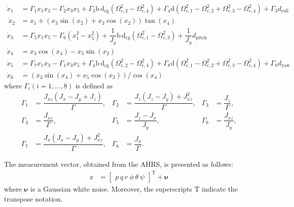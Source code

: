 \documentclass[3p]{elsarticle}
\begin{document}
\begin{align}
    \dot x_1& = \Gamma_1x_1x_3 - \Gamma_2x_3x_5 + \Gamma_3 \mathrm{b\,d}_{\text{cg}} (\Omega_{c, 2}^2 - \Omega_{c, 4}^2) + \Gamma_4\mathrm{d} (\Omega_{c, 1}^2 - \Omega_{c, 2}^2 + \Omega_{c, 3}^2 - \Omega_{c, 4}^2)+\Gamma_3d_{\text{roll}}\\[2mm]~\label{eq:eq_of_motion_start1}
    \dot x_2 &= x_1 + (x_3\sin(x_2) + x_3\cos(x_2))\tan(x_4)\\
    \dot x_3 &= \Gamma_5x_1x_5 - \Gamma_6(x_1^2-x_5^2) + \dfrac{1}{J_y}\mathrm{b\,d}_{\text{cg}} (\Omega_{c, 1}^2 - \Omega_{c, 3}^2)+ \dfrac{1}{J_y}d_{\text{pitch}}\\
    \dot x_4 &= x_3\cos(x_4) - x_5\sin(x_2)\\[2mm]
    \dot x_5 &= \Gamma_7x_1x_3 - \Gamma_1x_3x_5 + \Gamma_4\mathrm{b\,d}_{\text{cg}} (\Omega_{c, 2}^2 - \Omega_{c, 4}^2)+\Gamma_8\mathrm{d} (\Omega_{c, 1}^2 - \Omega_{c, 2}^2 + \Omega_{c, 3}^2 - \Omega_{c, 4}^2)+\Gamma_8d_{\text{yaw}}\\[2mm]
    \dot x_6 &= (x_3\sin(x_4) + x_5\cos(x_2))/\cos(x_4)~\label{eq:eq_of_motion_end1}
\end{align}
where $\Gamma_i (i = 1, \ldots, 8)$ is defined as
\begin{equation}
    \begin{aligned}
        \Gamma_1 &= \dfrac{J_{xz}(J_x-J_y+J_z)}{\Gamma}, & \Gamma_2 &= \dfrac{J_z(J_z-J_y)+J_{xz}^2}{\Gamma}, & \Gamma_3 &= \dfrac{J_z}{\Gamma}, \\
        \Gamma_4 &= \dfrac{J_{xz}}{\Gamma}, & \Gamma_5 &= \dfrac{J_z-J_x}{J_y}, & \Gamma_6 &= \dfrac{J_{xz}}{J_y}, \\
        \Gamma_7 &= \dfrac{J_x(J_x-J_y)+J_{xz}^2}{\Gamma}, & \Gamma_8 &= \dfrac{J_x}{\Gamma}.
    \end{aligned}
\end{equation}
    

The measurement vector, obtained from the AHRS, is presented as follows:
\begin{equation}
    \begin{split}
        \boldsymbol{\mathrm{z}} &= \begin{bmatrix}
        p \
        q \
        r \
        \phi \
        \theta \
        \psi
    \end{bmatrix}^\mathrm{T} + \boldsymbol{\nu}
    \end{split}
\end{equation}
where $\boldsymbol{\nu}$ is a Gaussian white noise. Moreover, the superscripts $\mathrm{T}$ indicate the transpose notation.
\end{document}
